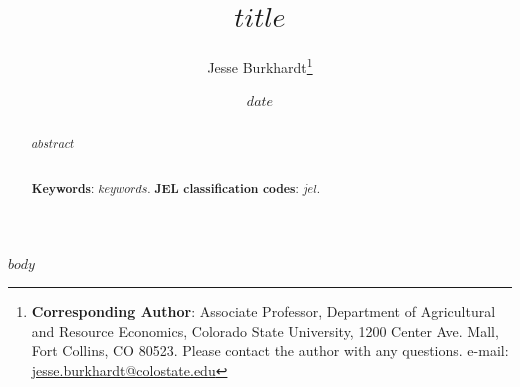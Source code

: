 \documentclass[12pt]{article}
\title{$title$}
\author{Jesse Burkhardt\footnote{\textbf{Corresponding Author}: Associate Professor, Department of Agricultural and Resource Economics, Colorado State University, 1200 Center Ave. Mall, Fort Collins, CO 80523. Please contact the author with any questions. e-mail: \href{mailto:jesse.burkhardt@colostate.edu}{jesse.burkhardt@colostate.edu}}}
\date{$date$}
\begin{document}
\maketitle
\thispagestyle{empty}
\hypersetup{pageanchor=false}

\begin{abstract}
$abstract$

\noindent
 \\

\noindent \textbf{Keywords}: $keywords$.
\newline
\textbf{JEL classification codes}: $jel$.
\end{abstract}

\newpage
\setcounter{page}{1}
\hypersetup{pageanchor=true}
\renewcommand{\baselinestretch}{1.5} \small \normalsize
\renewcommand{\thefootnote}{\arabic{footnote}}
\setcounter{footnote}{0}

\sloppy

$body$
\end{document}
